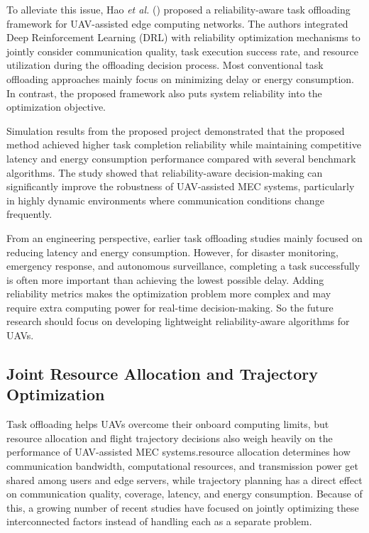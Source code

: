 \documentclass[a4paper, 12pt]{article}
\begin{document}
To alleviate this issue, Hao \textit{et al.} (\cite{Hao2025}) proposed a reliability-aware task offloading framework for UAV-assisted edge computing networks. The authors integrated Deep Reinforcement Learning (DRL) with reliability optimization mechanisms to jointly consider communication quality, task execution success rate, and resource utilization during the offloading decision process. Most conventional task offloading approaches mainly focus on minimizing delay or energy consumption. In contrast, the proposed framework also puts system reliability into the optimization objective.

Simulation results from the proposed project demonstrated that the proposed method achieved higher task completion reliability while maintaining competitive latency and energy consumption performance compared with several benchmark algorithms. The study showed that reliability-aware decision-making can significantly improve the robustness of UAV-assisted MEC systems, particularly in highly dynamic environments where communication conditions change frequently.

From an engineering perspective, earlier task offloading studies mainly focused on reducing latency and energy consumption. However, for disaster monitoring, emergency response, and autonomous surveillance, completing a task successfully is often more important than achieving the lowest possible delay. Adding reliability metrics makes the optimization problem more complex and may require extra computing power for real-time decision-making. So the future research should focus on developing lightweight reliability-aware algorithms for UAVs.


\subsection*{Joint Resource Allocation and Trajectory Optimization}
Task offloading helps UAVs overcome their onboard computing limits, but resource allocation and flight trajectory decisions also weigh heavily on the performance of UAV-assisted MEC systems.resource allocation determines how communication bandwidth, computational resources, and transmission power get shared among users and edge servers, while trajectory planning has a direct effect on communication quality, coverage, latency, and energy consumption. Because of this, a growing number of recent studies have focused on jointly optimizing these interconnected factors instead of handling each as a separate problem.
\end{document}
